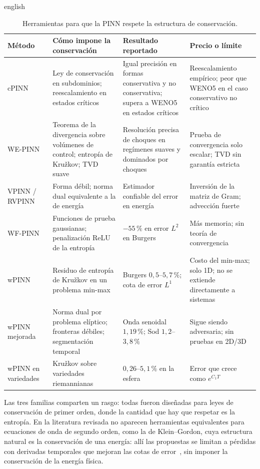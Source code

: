 \documentclass[0000.tex]{subfiles}
\begin{document}
\begin{hyphenrules}{english}
\begin{table}[htbp]
\centering\small
\caption{Herramientas para que la PINN respete la estructura de conservación.}
\label{tab:ea-cons}
\begin{tabularx}{\textwidth}{@{}l Y Y Y@{}}
\toprule
Método & Cómo impone la conservación & Resultado reportado & Precio o límite \\
\midrule
cPINN~\cite{jagtap2020conservative,quita2023conservative} & Ley de conservación en subdominios; reescalamiento en estados críticos & Igual precisión en formas conservativa y no conservativa; supera a WENO5 en estados críticos & Reescalamiento empírico; peor que WENO5 en el caso conservativo no crítico \\
WE-PINN~\cite{oubarka2026weak} & Teorema de la divergencia sobre volúmenes de control; entropía de Kružkov; TVD suave & Resolución precisa de choques en regímenes suaves y dominados por choques & Prueba de convergencia solo escalar; TVD sin garantía estricta \\
VPINN / RVPINN~\cite{kharazmi2019vpinns,rojas2024robust} & Forma débil; norma dual equivalente a la de energía & Estimador confiable del error en energía & Inversión de la matriz de Gram; advección fuerte \\
WF-PINN~\cite{wang2025wf} & Funciones de prueba gaussianas; penalización ReLU de la entropía & $-55\,\%$ en error $L^2$ en Burgers & Más memoria; sin teoría de convergencia \\
wPINN~\cite{de2024wpinns} & Residuo de entropía de Kružkov en un problema min-max & Burgers $0{,}5$--$5{,}7\,\%$; cota de error $L^1$ & Costo del min-max; solo 1D; no se extiende directamente a sistemas \\
wPINN mejorada~\cite{chaumet2024improving} & Norma dual por problema elíptico; fronteras débiles; segmentación temporal & Onda senoidal $1{,}19\,\%$; Sod $1{,}2$--$3{,}8\,\%$ & Sigue siendo adversaria; sin pruebas en 2D/3D \\
wPINN en variedades~\cite{zhou2025weak} & Kružkov sobre variedades riemannianas & $0{,}26$--$5{,}1\,\%$ en la esfera & Error que crece como $e^{C_1T}$ \\
\bottomrule
\end{tabularx}
\end{table}

Las tres familias comparten un rasgo: todas fueron diseñadas para leyes de conservación de primer orden, donde la cantidad que hay que respetar es la entropía. En la literatura revisada no aparecen herramientas equivalentes para ecuaciones de onda de segundo orden, como la de Klein--Gordon, cuya estructura natural es la conservación de una energía: allí las propuestas se limitan a pérdidas con derivadas temporales que mejoran las cotas de error~\cite{qian2023error}, sin imponer la conservación de la energía física.


\end{hyphenrules}
\end{document}
